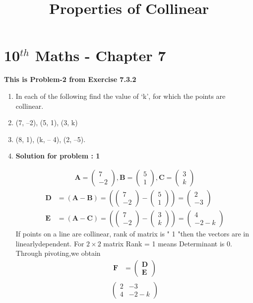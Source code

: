 \documentclass[journal,10pt,twocolumn]{article}
\newcommand{\myvec}[1]{\ensuremath{\begin{pmatrix}#1\end{pmatrix}}}
\let\vec\mathbf
\providecommand{\brak}[1]{\ensuremath{\left(#1\right)}}
\let\vec\mathbf
\begin{document}
\begin{center}
\title{\textbf{Properties of Collinear}}
\date{\vspace{-5ex}} %
\maketitle
\end{center}
\setcounter{page}{1}
\section{10$^{th}$ Maths - Chapter 7}
\textbf{This is Problem-2 from Exercise 7.3.2}
\begin{enumerate}
\item In each of the following find the value of ‘k’, for which the points are collinear.

\item (7, –2), (5, 1), (3, k) \\
\item (8, 1), (k, – 4), (2, –5).\\

\item \textbf{Solution for problem : 1}

\begin{align}  
\vec{A}=\myvec{7 \\-2},
\vec{B}=\myvec{5 \\ 1},
\vec{C}=\myvec{3 \\ k}
\end{align}
\begin{align}
\vec{D} &=\brak{\vec{A}-\vec{B}} = \brak{\myvec{7 \\-2 } - \myvec{5 \\1 } } = \myvec{2 \\ -3 }\\
\vec{E} &= \brak{\vec{A}-\vec{C}} = \brak{\myvec{7 \\ -2 } - \myvec{3 \\k} } = \myvec{4 \\-2-k}
\end{align}
 If points on a line  are  collinear, rank of matrix is " 1 "then the vectors are in linearlydependent.
For $2\times2$ matrix Rank = 1 means Determinant is 0.
Through pivoting,we obtain
\begin{align}
\vec{F} &={\myvec{\vec{D}\\ \vec{E}}}
\end{align}
\begin{align}
\begin{split}
\myvec{
2 & -3
 \\
4 & -2-k 
}
\end{split}
\end{align}


\end{enumerate}
\end{document}
